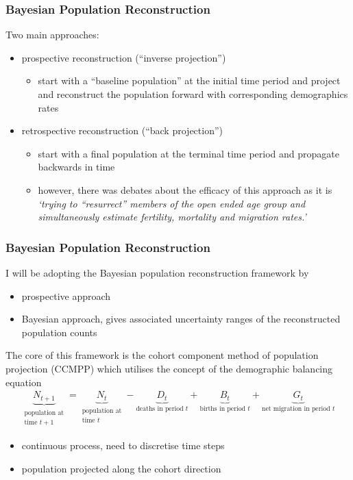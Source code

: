 \documentclass[hyperref={colorlinks, citecolor=blue}]{beamer}
\begin{document}
\begin{frame}
\frametitle{Bayesian Population Reconstruction}
Two main approaches:
\begin{itemize}
\item prospective reconstruction (``inverse projection'')
	\begin{itemize}
	\item[\hookrightarrow] start with a ``baseline population'' at the initial time period and project and reconstruct the population forward with corresponding demographics rates
	\end{itemize}
\item retrospective reconstruction (``back projection'')
	\begin{itemize}
	\item[\hookrightarrow] start with a final population at the terminal time period and propagate backwards in time
	\item[\hookrightarrow] however, there was debates about the efficacy of this approach as it is \textit{`trying to ``resurrect'' members of the open ended age group and simultaneously estimate fertility, mortality and migration rates.'} \citep{wheldon2016bayesian}
	\end{itemize}
\end{itemize}
\end{frame}


\begin{frame}
\frametitle{Bayesian Population Reconstruction}
I will be adopting the Bayesian population reconstruction framework by \citet{wheldon2016bayesian}
\begin{itemize}
\item prospective approach
\item Bayesian approach, gives associated uncertainty ranges of the reconstructed population counts
\end{itemize}

The core of this framework is the cohort component method of population projection (CCMPP) which utilises the concept of the demographic balancing equation
\begin{align*}
\underbrace{N_{t+1}}_{\substack{\text{population at} \\ \text{time $t+1$}}} = \underbrace{N_t}_{\substack{\text{population at} \\ \text{time $t$}}} - \underbrace{D_t}_{\text{deaths in period } t} + \underbrace{B_t}_{\text{births in period } t} + \underbrace{G_t}_{\text{net migration in period } t}
\end{align*}
\begin{itemize}
\item continuous process, need to discretise time steps
\item population projected along the cohort direction
\end{itemize}
\end{frame}
\end{document}
